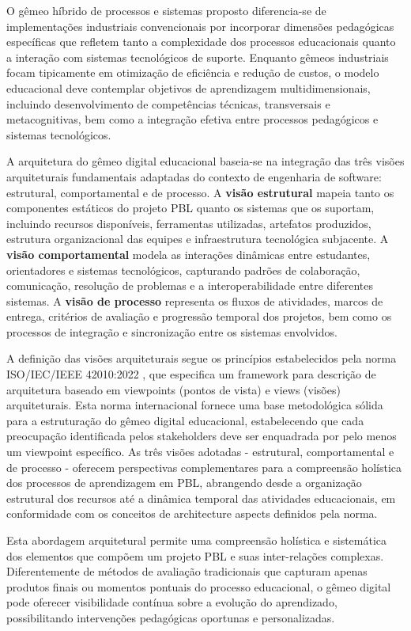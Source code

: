 \documentclass[12pt, a4paper, oneside]{abntex2}
\begin{document}
O gêmeo híbrido de processos e sistemas proposto diferencia-se de implementações industriais convencionais por incorporar dimensões pedagógicas específicas que refletem tanto a complexidade dos processos educacionais quanto a interação com sistemas tecnológicos de suporte. Enquanto gêmeos industriais focam tipicamente em otimização de eficiência e redução de custos, o modelo educacional deve contemplar objetivos de aprendizagem multidimensionais, incluindo desenvolvimento de competências técnicas, transversais e metacognitivas, bem como a integração efetiva entre processos pedagógicos e sistemas tecnológicos.

A arquitetura do gêmeo digital educacional baseia-se na integração das três visões arquiteturais fundamentais adaptadas do contexto de engenharia de software: estrutural, comportamental e de processo. A \textbf{visão estrutural} mapeia tanto os componentes estáticos do projeto PBL quanto os sistemas que os suportam, incluindo recursos disponíveis, ferramentas utilizadas, artefatos produzidos, estrutura organizacional das equipes e infraestrutura tecnológica subjacente. A \textbf{visão comportamental} modela as interações dinâmicas entre estudantes, orientadores e sistemas tecnológicos, capturando padrões de colaboração, comunicação, resolução de problemas e a interoperabilidade entre diferentes sistemas. A \textbf{visão de processo} representa os fluxos de atividades, marcos de entrega, critérios de avaliação e progressão temporal dos projetos, bem como os processos de integração e sincronização entre os sistemas envolvidos.

A definição das visões arquiteturais segue os princípios estabelecidos pela norma ISO/IEC/IEEE 42010:2022 \cite{iso42010}, que especifica um framework para descrição de arquitetura baseado em viewpoints (pontos de vista) e views (visões) arquiteturais. Esta norma internacional fornece uma base metodológica sólida para a estruturação do gêmeo digital educacional, estabelecendo que cada preocupação identificada pelos stakeholders deve ser enquadrada por pelo menos um viewpoint específico. As três visões adotadas - estrutural, comportamental e de processo - oferecem perspectivas complementares para a compreensão holística dos processos de aprendizagem em PBL, abrangendo desde a organização estrutural dos recursos até a dinâmica temporal das atividades educacionais, em conformidade com os conceitos de architecture aspects definidos pela norma.

Esta abordagem arquitetural permite uma compreensão holística e sistemática dos elementos que compõem um projeto PBL e suas inter-relações complexas. Diferentemente de métodos de avaliação tradicionais que capturam apenas produtos finais ou momentos pontuais do processo educacional, o gêmeo digital pode oferecer visibilidade contínua sobre a evolução do aprendizado, possibilitando intervenções pedagógicas oportunas e personalizadas.
\end{document}
